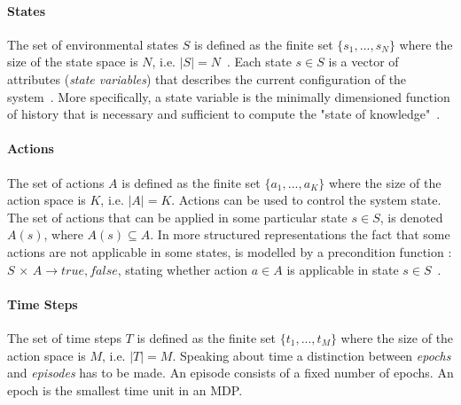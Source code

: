 \paragraph{States} The set of environmental states $S$ is defined as the finite set $\{s_1, . . . , s_N\}$ where the size of the state space is $N$, i.e. $|S| = N$~\cite{wiering2012reinforcement}. Each state ${s \in S}$ is a vector of attributes (\textit{state variables}) that describes the current configuration of the system~\cite{Nevmyvaka}. More specifically, a state variable is the minimally dimensioned function of history that is necessary and sufficient to compute the "state of knowledge"~\cite{Powell}.

\paragraph{Actions} The set of actions $A$ is defined as the finite set $\{a_1, . . . ,a_K\}$ where the size of the action space is $K$, i.e. $|A| = K$. Actions can be used to control the system state. The set of actions that can be applied in some particular state $s \in S$, is denoted $A(s)$, where $A(s) \subseteq A$. In more structured representations the fact that some actions are not applicable in some states, is modelled by a precondition function : $S$ × $A→{true,false}$, stating whether action $a \in A$ is applicable in state $s \in S$~\cite{wiering2012reinforcement}.

\paragraph{Time Steps} The set of time steps $T$ is defined as the finite set $\{t_1, . . . ,t_M\}$ where the size of the action space is $M$, i.e. $|T| = M$. Speaking about time a distinction between \textit{epochs} and \textit{episodes} has to be made. An episode consists of a fixed number of epochs. An epoch is the smallest time unit in an MDP.

